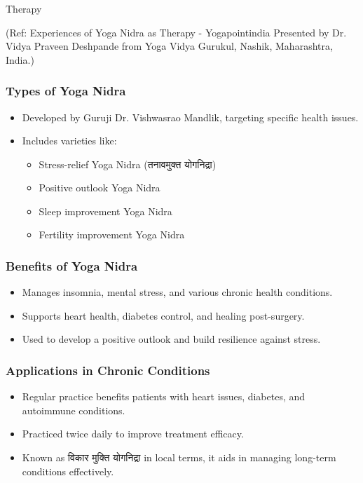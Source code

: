 \begin{frame}[fragile]\frametitle{}
\begin{center}
{\Large Therapy}

(Ref: Experiences of Yoga Nidra as Therapy - Yogapointindia Presented by Dr. Vidya Praveen Deshpande from Yoga Vidya Gurukul, Nashik, Maharashtra, India.)
\end{center}
\end{frame}

\begin{frame}[fragile]\frametitle{Types of Yoga Nidra}
    \begin{itemize}
        \item Developed by Guruji Dr. Vishwasrao Mandlik, targeting specific health issues.
        \item Includes varieties like:
        \begin{itemize}
            \item Stress-relief Yoga Nidra (तनावमुक्त योगनिद्रा)
            \item Positive outlook Yoga Nidra
            \item Sleep improvement Yoga Nidra
            \item Fertility improvement Yoga Nidra
        \end{itemize}
    \end{itemize}
\end{frame}

\begin{frame}[fragile]\frametitle{Benefits of Yoga Nidra}
    \begin{itemize}
        \item Manages insomnia, mental stress, and various chronic health conditions.
        \item Supports heart health, diabetes control, and healing post-surgery.
        \item Used to develop a positive outlook and build resilience against stress.
    \end{itemize}
\end{frame}

\begin{frame}[fragile]\frametitle{Applications in Chronic Conditions}
    \begin{itemize}
        \item Regular practice benefits patients with heart issues, diabetes, and autoimmune conditions.
        \item Practiced twice daily to improve treatment efficacy.
        \item Known as विकार मुक्ति योगनिद्रा in local terms, it aids in managing long-term conditions effectively.
    \end{itemize}
\end{frame}

